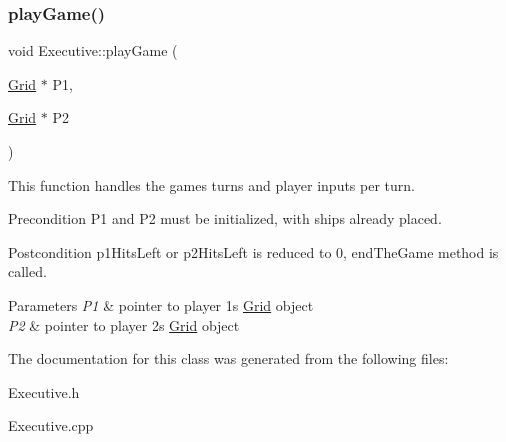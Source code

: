 \subsubsection{\texorpdfstring{play\+Game()}{playGame()}}
{\footnotesize\ttfamily void Executive\+::play\+Game (\begin{DoxyParamCaption}\item[{\hyperlink{classGrid}{Grid} $\ast$}]{P1,  }\item[{\hyperlink{classGrid}{Grid} $\ast$}]{P2 }\end{DoxyParamCaption})}



This function handles the game\textquotesingle{}s turns and player inputs per turn. 

\begin{DoxyPrecond}{Precondition}
P1 and P2 must be initialized, with ships already placed. 
\end{DoxyPrecond}
\begin{DoxyPostcond}{Postcondition}
p1\+Hits\+Left or p2\+Hits\+Left is reduced to 0, end\+The\+Game method is called. 
\end{DoxyPostcond}

\begin{DoxyParams}{Parameters}
{\em P1} & pointer to player 1\textquotesingle{}s \hyperlink{classGrid}{Grid} object \\
\hline
{\em P2} & pointer to player 2\textquotesingle{}s \hyperlink{classGrid}{Grid} object \\
\hline
\end{DoxyParams}


The documentation for this class was generated from the following files\+:\begin{DoxyCompactItemize}
\item 
Executive.\+h\item 
Executive.\+cpp\end{DoxyCompactItemize}
